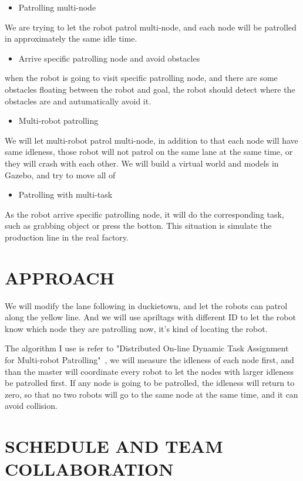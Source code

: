 \documentclass[letterpaper, 10 pt, conference]{ieeeconf}  %
\begin{document}
\begin{itemize}
\item Patrolling multi-node
\end{itemize}
We are trying to let the robot patrol multi-node, and each node will be patrolled in approximately the same idle time.
\begin{itemize}
\item Arrive specific patrolling node and avoid obstacles
\end{itemize}
when the robot is going to visit specific patrolling node, and there are some obstacles floating between the robot and goal, the robot should detect where the obstacles are and autumatically avoid it.
\begin{itemize}
\item Multi-robot patrolling
\end{itemize}
We will let multi-robot patrol multi-node, in addition to that each node will have same idleness, those robot will not patrol on the same lane at the same time, or they will crash with each other.
We will build a virtual world and models in Gazebo, and try to move all of 
\begin{itemize}
\item Patrolling with multi-task
\end{itemize}
As the robot arrive specific patrolling node, it will do the corresponding task, such as grabbing object or press the botton. This situation is simulate the production line in the real factory.

\section{APPROACH}

We will modify the lane following in duckietown, and let the robots can patrol along the yellow line. And we will use apriltags with different ID to let the robot know which node they are patrolling now, it's kind of locating the robot.

The algorithm I use is refer to "Distributed On-line Dynamic Task Assignment for Multi-robot Patrolling"~\cite{Farinelli:2017:DOD:3124264.3124274}, we will measure the idleness of each node first, and than the master will coordinate every robot to let the nodes with larger idleness be patrolled first. If any node is going to be patrolled, the idleness will return to zero, so that no two robots will go to the same node at the same time, and it can avoid collision.   


\section{SCHEDULE AND TEAM COLLABORATION}
\end{document}
